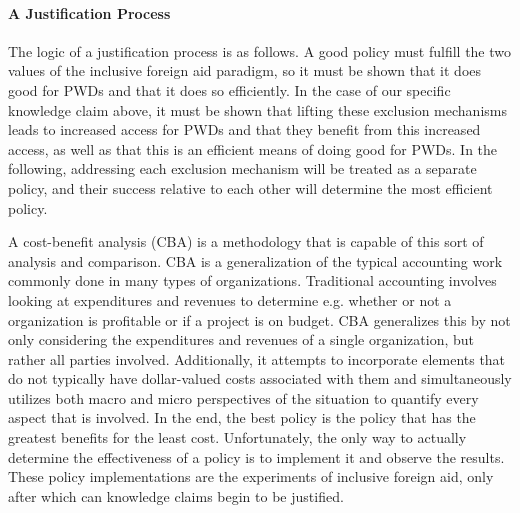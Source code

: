 \documentclass[a4paper]{article}
\begin{document}
\paragraph{A Justification Process}

The logic of a justification process is as follows. A good policy must
fulfill the two values of the inclusive foreign aid paradigm, so it must be
shown that it does good for PWDs and that it does so efficiently. In the case
of our specific knowledge claim above, it must be shown that lifting these
exclusion mechanisms leads to increased access for PWDs and that they benefit
from this increased access, as well as that this is an efficient means of
doing good for PWDs. In the following, addressing each exclusion mechanism
will be treated as a separate policy, and their success relative to each other
will determine the most efficient policy. 

A cost-benefit analysis (CBA) is a methodology that is capable of this sort of
analysis and comparison. CBA is a generalization of the typical accounting
work commonly done in many types of organizations. Traditional accounting
involves looking at expenditures and revenues to determine e.g. whether or not
a organization is profitable or if a project is on budget. CBA generalizes
this by not only considering the expenditures and revenues of a single
organization, but rather all parties involved. Additionally, it attempts to
incorporate elements that do not typically have dollar-valued costs associated
with them \citep{mishan2015elements} and simultaneously utilizes both macro
and micro perspectives of the situation to quantify every aspect that is
involved. In the end, the best policy is the policy that has the greatest
benefits for the least cost. Unfortunately, the only way to actually determine
the effectiveness of a policy is to implement it and observe the results.
These policy implementations are the experiments of inclusive foreign aid,
only after which can knowledge claims begin to be justified. 
\end{document}
